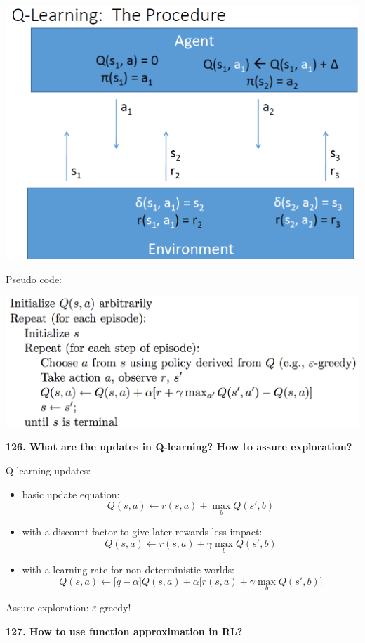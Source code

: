 \includegraphics[width=\columnwidth]{media/image3.png}

Pseudo code:

\includegraphics[width=\columnwidth]{media/image14.png}

\textbf{126. What are the updates in Q-learning? How to assure
exploration?}

Q-learning updates:
\begin{itemize}
  \item basic update equation:
  \[ Q(s, a) \leftarrow r(s, a) + \max_b Q(s', b)\]
  \item with a discount factor to give later rewards less impact:
  \[ Q(s, a) \leftarrow r(s, a) + \gamma \max_b Q(s', b)\]
  \item with a learning rate for non-deterministic worlds:
  \[ Q(s, a) \leftarrow \big[ q-\alpha \big] Q(s, a) + \alpha \big[ r(s, a) + \gamma \max_b Q(s', b) \big] \]
\end{itemize}

Assure exploration: $\varepsilon$-greedy!

\textbf{127. How to use function approximation in RL?}

